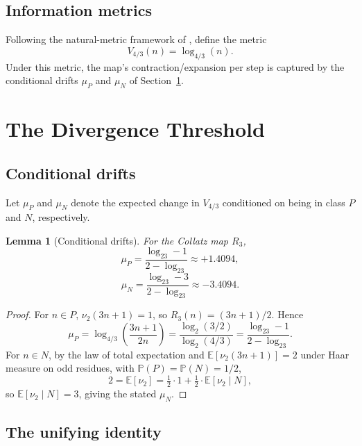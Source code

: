 \documentclass[12pt,reqno]{amsart}
\theoremstyle{plain}
\newtheorem{lemma}[theorem]{Lemma}
\theoremstyle{definition}
\newcommand{\E}{\mathbb{E}}
\newcommand{\PP}{\mathbb{P}}
\newcommand{\nuTwo}{\nu_2}
\newcommand{\logtwo}{\log_2}
\newcommand{\muP}{\mu_P}
\newcommand{\muN}{\mu_N}
\newcommand{\Vmetric}{V_{4/3}}
\begin{document}
\subsection{Information metrics}

Following the natural-metric framework of \cite{lagarias2010}, define the
metric
\[
\Vmetric(n) = \log_{4/3}(n).
\]
Under this metric, the map's contraction/expansion per step is captured by
the conditional drifts $\muP$ and $\muN$ of Section~\ref{sec:main}.

\section{The Divergence Threshold}\label{sec:main}

\subsection{Conditional drifts}

Let $\muP$ and $\muN$ denote the expected change in $\Vmetric$ conditioned on
being in class $P$ and $N$, respectively.

\begin{lemma}[Conditional drifts]\label{lem:conditional}
For the Collatz map $R_3$,
\begin{equation}\label{eq:muP}
\muP = \frac{\logtwo 3 - 1}{2 - \logtwo 3} \approx +1.4094,
\end{equation}
\begin{equation}\label{eq:muN}
\muN = \frac{\logtwo 3 - 3}{2 - \logtwo 3} \approx -3.4094.
\end{equation}
\end{lemma}

\begin{proof}
For $n \in P$, $\nuTwo(3n+1) = 1$, so $R_3(n) = (3n+1)/2$. Hence
\[
\muP = \log_{4/3}\!\left(\frac{3n+1}{2n}\right)
     = \frac{\logtwo(3/2)}{\logtwo(4/3)}
     = \frac{\logtwo 3 - 1}{2 - \logtwo 3}.
\]
For $n \in N$, by the law of total expectation and $\E[\nuTwo(3n+1)] = 2$
under Haar measure on odd residues, with $\PP(P) = \PP(N) = 1/2$,
\[
2 = \E[\nuTwo] = \tfrac12 \cdot 1 + \tfrac12 \cdot \E[\nuTwo \mid N],
\]
so $\E[\nuTwo \mid N] = 3$, giving the stated $\muN$. \qedhere
\end{proof}

\subsection{The unifying identity}
\end{document}
